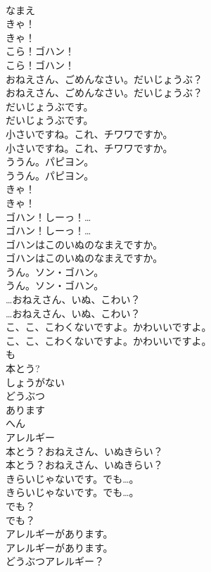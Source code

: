 \documentclass[8pt]{extreport}
\begin{document}
\begin{CJK}{UTF8}{min}
\\	なまえ
\\	きゃ！	
\\	きゃ！ 
\\	こら！ゴハン！	
\\	こら！ゴハン！ 
\\	おねえさん、ごめんなさい。だいじょうぶ？	
\\	おねえさん、ごめんなさい。だいじょうぶ？ 
\\	だいじょうぶです。	
\\	だいじょうぶです。 
\\	小さいですね。これ、チワワですか。	
\\	小さいですね。これ、チワワですか。 
\\	ううん。パピヨン。	
\\	ううん。パピヨン。 
\\	きゃ！	
\\	きゃ！ 
\\	ゴハン！しーっ！…	
\\	ゴハン！しーっ！… 
\\	ゴハンはこのいぬのなまえですか。	
\\	ゴハンはこのいぬのなまえですか。 
\\	うん。ソン・ゴハン。	
\\	うん。ソン・ゴハン。 
\\	…おねえさん、いぬ、こわい？	
\\	…おねえさん、いぬ、こわい？ 
\\	こ、こ、こわくないですよ。かわいいですよ。	
\\	こ、こ、こわくないですよ。かわいいですよ。 
\\	も
\\	本とう?
\\	しょうがない
\\	どうぶつ
\\	あります
\\	へん
\\	アレルギー
\\	本とう？おねえさん、いぬきらい？	
\\	本とう？おねえさん、いぬきらい？ 
\\	きらいじゃないです。でも…。	
\\	きらいじゃないです。でも…。 
\\	でも？	
\\	でも？ 
\\	アレルギーがあります。	
\\	アレルギーがあります。 
\\	どうぶつアレルギー？	

\end{CJK}
\end{document}
